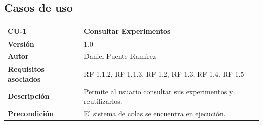\subsection{Casos de uso}\label{casos-de-uso}
\begin{longtable}[H]{@{}ll@{}}
\toprule
\begin{minipage}[b]{0.23\columnwidth}\raggedright\strut
\textbf{CU-1}\strut
\end{minipage} & \begin{minipage}[b]{0.71\columnwidth}\raggedright\strut
\textbf{Consultar Experimentos}\strut
\end{minipage}\tabularnewline
\midrule
\endhead
\begin{minipage}[t]{0.23\columnwidth}\raggedright\strut
\textbf{Versión}\strut
\end{minipage} & \begin{minipage}[t]{0.71\columnwidth}\raggedright\strut
1.0\strut
\end{minipage}\tabularnewline
\begin{minipage}[t]{0.23\columnwidth}\raggedright\strut
\textbf{Autor}\strut
\end{minipage} & \begin{minipage}[t]{0.71\columnwidth}\raggedright\strut
Daniel Puente Ramírez\strut
\end{minipage}\tabularnewline
\begin{minipage}[t]{0.23\columnwidth}\raggedright\strut
\textbf{Requisitos asociados}\strut
\end{minipage} & \begin{minipage}[t]{0.71\columnwidth}\raggedright\strut
RF-1.1.2, RF-1.1.3, RF-1.2, RF-1.3, RF-1.4, RF-1.5\strut
\end{minipage}\tabularnewline
\begin{minipage}[t]{0.23\columnwidth}\raggedright\strut
\textbf{Descripción}\strut
\end{minipage} & \begin{minipage}[t]{0.71\columnwidth}\raggedright\strut
Permite al usuario consultar sus experimentos y reutilizarlos.\strut
\end{minipage}\tabularnewline
\begin{minipage}[t]{0.23\columnwidth}\raggedright\strut
\textbf{Precondición}\strut
\end{minipage} & \begin{minipage}[t]{0.71\columnwidth}\raggedright\strut
El sistema de colas se encuentra en ejecución.\strut
\end{minipage}\tabularnewline

\end{longtable}
